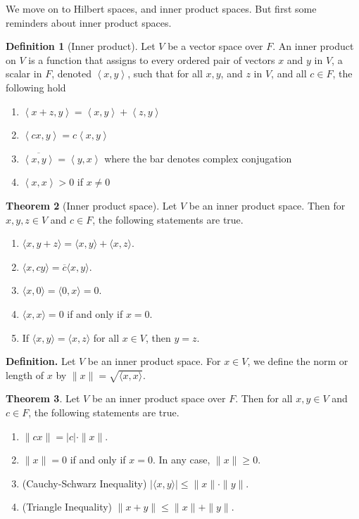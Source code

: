 \documentclass[13pt]{article}
\newcommand{\inprod}[1]{\left\langle #1 \right\rangle}
\theoremstyle{definition} --- default
\newtheorem{theorem}{Theorem}
\theoremstyle{definition}
\newtheorem{definition}[theorem]{Definition}
\theoremstyle{remark}
\begin{document}
We move on to Hilbert spaces, and inner product spaces. But first some reminders about inner product spaces. 
\begin{definition}[Inner product]
	Let $V$ be a vector space over $F$. An inner product on $V$ is a function that assigns to every ordered pair of vectors $x$ and $y$ in $V$, a scalar in $F$, denoted $\inprod{x,y}$, such that for all $x,y$, and $z$ in $V$, and all $c \in F$, the following hold
	\begin{enumerate}
		\item $\inprod{x+z,y} = \inprod{x,y} + \inprod{z,y}$
		\item $\inprod{cx,y} = c\inprod{x,y}$
		\item $\overline{\inprod{x,y}} = \inprod{y,x}$ where the bar denotes complex conjugation
		\item $\inprod{x,x} > 0$ if $x \neq 0 $
	\end{enumerate} 
	
\end{definition}
	\begin{theorem}[Inner product space]
Let \( V \) be an inner product space. Then for \( x, y, z \in V \) and \( c \in F \), the following statements are true.
\begin{enumerate}
\item[(a)] \( \langle x, y + z \rangle = \langle x, y \rangle + \langle x, z \rangle \).
\item[(b)] \( \langle x, cy \rangle = \overline{c} \langle x, y \rangle \).
\item[(c)] \( \langle x, 0 \rangle = \langle 0, x \rangle = 0 \).
\item[(d)] \( \langle x, x \rangle = 0 \) if and only if \( x = 0 \).
\item[(e)] If \( \langle x, y \rangle = \langle x, z \rangle \) for all \( x \in V \), then \( y = z \).
\end{enumerate}
\end{theorem}
\textbf{Definition.} Let \( V \) be an inner product space. For \( x \in V \), we define the norm or length of \( x \) by \( \lVert x \rVert = \sqrt{\langle x, x \rangle} \).


\begin{theorem} Let \( V \) be an inner product space over \( F \). Then for all \( x, y \in V \) and \( c \in F \), the following statements are true.
\begin{enumerate}
\item \( \|cx\| = |c| \cdot \|x\| \).
\item \( \|x\| = 0 \) if and only if \( x = 0 \). In any case, \( \|x\| \geq 0 \).
\item (Cauchy-Schwarz Inequality) \( |\langle x, y \rangle| \leq \|x\| \cdot \|y\| \).
\item (Triangle Inequality) \( \|x + y\| \leq \|x\| + \|y\| \).
\end{enumerate}
\end{theorem}
\end{document}
